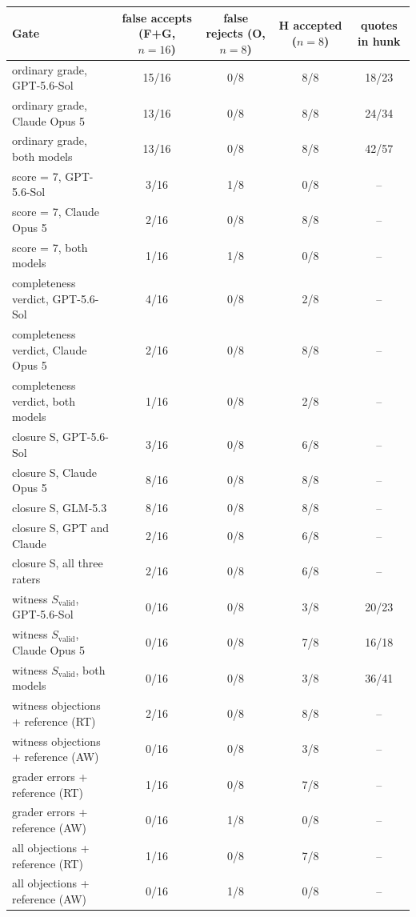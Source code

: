 \begin{tabular}{@{}lcccc@{}}
\toprule
Gate & false accepts (F+G, $n{=}16$) & false rejects (O, $n{=}8$) & H accepted ($n{=}8$) & quotes in hunk \\
\midrule
ordinary grade, GPT-5.6-Sol & 15/16 & 0/8 & 8/8 & 18/23 \\
ordinary grade, Claude Opus 5 & 13/16 & 0/8 & 8/8 & 24/34 \\
ordinary grade, both models & 13/16 & 0/8 & 8/8 & 42/57 \\
\addlinespace[2pt]
score = 7, GPT-5.6-Sol & 3/16 & 1/8 & 0/8 & -- \\
score = 7, Claude Opus 5 & 2/16 & 0/8 & 8/8 & -- \\
score = 7, both models & 1/16 & 1/8 & 0/8 & -- \\
\addlinespace[2pt]
completeness verdict, GPT-5.6-Sol & 4/16 & 0/8 & 2/8 & -- \\
completeness verdict, Claude Opus 5 & 2/16 & 0/8 & 8/8 & -- \\
completeness verdict, both models & 1/16 & 0/8 & 2/8 & -- \\
\addlinespace[2pt]
closure S, GPT-5.6-Sol & 3/16 & 0/8 & 6/8 & -- \\
closure S, Claude Opus 5 & 8/16 & 0/8 & 8/8 & -- \\
closure S, GLM-5.3 & 8/16 & 0/8 & 8/8 & -- \\
closure S, GPT and Claude & 2/16 & 0/8 & 6/8 & -- \\
closure S, all three raters & 2/16 & 0/8 & 6/8 & -- \\
\addlinespace[2pt]
witness $S_{\mathrm{valid}}$, GPT-5.6-Sol & 0/16 & 0/8 & 3/8 & 20/23 \\
witness $S_{\mathrm{valid}}$, Claude Opus 5 & 0/16 & 0/8 & 7/8 & 16/18 \\
witness $S_{\mathrm{valid}}$, both models & 0/16 & 0/8 & 3/8 & 36/41 \\
\addlinespace[2pt]
witness objections + reference (RT) & 2/16 & 0/8 & 8/8 & -- \\
witness objections + reference (AW) & 0/16 & 0/8 & 3/8 & -- \\
grader errors + reference (RT) & 1/16 & 0/8 & 7/8 & -- \\
grader errors + reference (AW) & 0/16 & 1/8 & 0/8 & -- \\
all objections + reference (RT) & 1/16 & 0/8 & 7/8 & -- \\
all objections + reference (AW) & 0/16 & 1/8 & 0/8 & -- \\
\bottomrule
\end{tabular}
